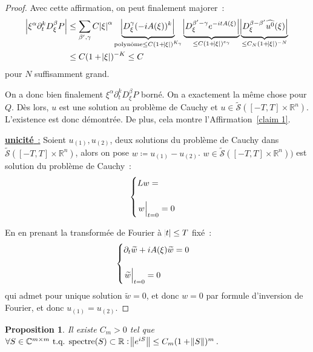 \documentclass{report}
\DeclareMathOperator{\spectreOperator}{spectre\!}
\newcommand{\C}{{\mathbb C}}
\newcommand{\R}{{\mathbb R}}
\newcommand{\tq}{\text{ t.q. }}
\newcommand{\st}{\tq}
\newcommand{\spectre}[1]{{\spectreOperator\left(#1\right)}}
\newcommand{\restr}[2]{\left.#1\vphantom{\big|}\right|_{#2}}
\newcommand{\unic}{{\underline {\textbf{unicité}~:}} }
\newtheorem{prp}[thm]{Proposition}
\theoremstyle{definition}
\theoremstyle{remark}
\begin{document}
\begin{proof}
Avec cette affirmation, on peut finalement majorer~:
\begin{align*}
	\abs {\xi^\alpha\partial_t^kD_\xi^\beta P}
	&\leq \sum_{\beta',\gamma}C\abs \xi^\alpha\underbrace {\abs {D_\xi^\gamma (-iA(\xi))^k}}_{\text{polynôme} \leq C(1+\abs\xi)^{K_\gamma}}\underbrace {\abs {D_\xi^{\beta'-\gamma}e^{-itA(\xi)}}}_{\leq C(1+\abs\xi)^{e_\gamma}}\underbrace {\abs {D_\xi^{\beta-\beta'}\widehat {u^0}(\xi)}}_{\leq C_N(1+\abs\xi)^{-N}} \\
	&\leq C(1+\abs\xi)^{-K} \leq C
\end{align*}
pour $N$ suffisamment grand.

On a donc bien finalement $\xi^\alpha\partial_t^kD_\xi^\beta P$ borné. On a exactement la même chose pour $Q$. Dès lors, $u$ est une solution au problème de Cauchy
et $u \in \widetilde {\mathcal S}([-T, T] \times \R^n)$. L'existence est donc démontrée. De plus, cela montre l'Affirmation~\ref{claim 1}.

\unic Soient $u_{(1)}, u_{(2)}$, deux solutions du problème de Cauchy dans $\widetilde {\mathcal S}([-T, T] \times \R^n)$, alors on pose $w \coloneqq u_{(1)} - u_{(2)}$.
$w \in \widetilde {\mathcal S}([-T, T] \times \R^n))$ est solution du problème de Cauchy~:
\[\begin{cases}Lw = \\&\\\restr w{t=0} = 0\end{cases}\]

En en prenant la transformée de Fourier à $\abs t \leq T$ fixé~:
\[\begin{cases}\partial_t\widetilde w + iA(\xi)\widetilde w = 0\\&\\\restr {\widetilde w}{t=0} = 0\end{cases}\]
qui admet pour unique solution $\widetilde w = 0$, et donc $w = 0$ par formule d'inversion de Fourier, et donc $u_{(1)} = u_{(2)}$.
\end{proof}

\begin{prp} Il existe $C_m > 0$ tel que $\forall S \in \C^{m \times m} \st \spectre S \subset \R : \norm {e^{iS}} \leq C_m(1+\norm S)^m$.
\end{prp}
\end{document}
